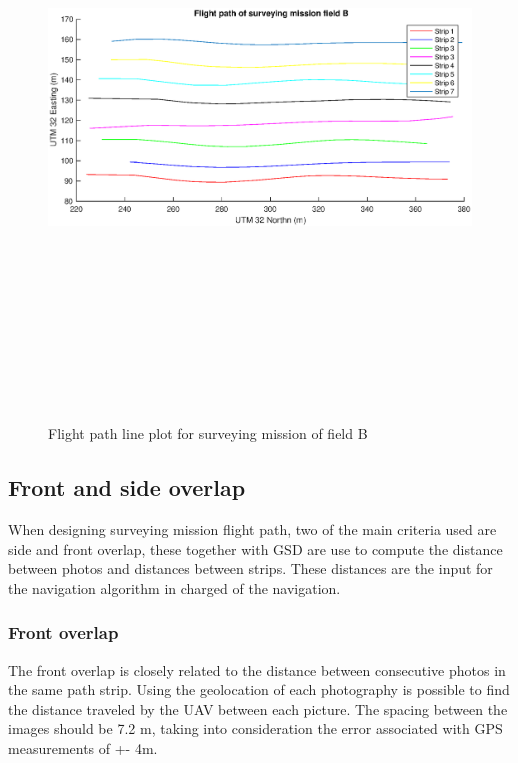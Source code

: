\begin{figure}[H]
\centering
\includegraphics[width=16cm,height=16cm,keepaspectratio]{imagenes/graph.eps}
\caption{ Flight path line plot for surveying mission of field B}
\label{fig:FielB}
\end{figure}
\subsection{Front and side overlap}
When designing surveying mission flight path, two of the main criteria used are side and front overlap, these together with GSD are use to compute the distance between photos and distances between strips. These distances are the input for the navigation algorithm in charged of the navigation.
\subsubsection{Front overlap}
The front overlap is closely related to the distance between consecutive photos in the same path strip.  Using the geolocation of each photography is possible to find the distance traveled by the UAV between each picture. The spacing between the images should be 7.2 m, taking into consideration the error associated with GPS measurements of +- 4m. 

